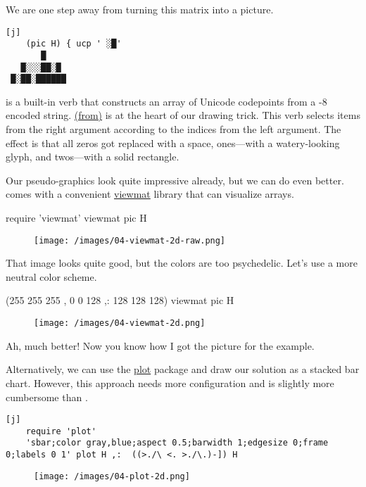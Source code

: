\documentclass{article}
\begin{document}
We are one step away from turning this matrix into a picture.

\begin{verbatim}[j]
    (pic H) { ucp ' ░█'
       █    
   █░░░██░█ 
 █░██░██████
\end{verbatim}

 is a built-in verb that constructs an array of Unicode codepoints from a -8 encoded string.
\href{https://code.jsoftware.com/wiki/Vocabulary/curlylf#dyadic}{\code{\{} (from)} is at the heart of our drawing trick.
This verb selects items from the right argument according to the indices from the left argument.
The effect is that all zeros got replaced with a space, ones---with a watery-looking glyph, and twos---with a solid rectangle.

Our pseudo-graphics look quite impressive already, but we can do even better.
 comes with a convenient \href{https://code.jsoftware.com/wiki/Studio/Viewmat}{viewmat} library that can visualize arrays.

\begin{code}[j]
    require 'viewmat'
    viewmat pic H
\end{code}

\begin{figure}
   \texttt{[image: /images/04-viewmat-2d-raw.png]}
\end{figure}

That image looks quite good, but the colors are too psychedelic.
Let's use a more neutral color scheme.

\begin{code}[j]
    (255 255 255 , 0 0 128 ,: 128 128 128) viewmat pic H
\end{code}

\begin{figure}
   \texttt{[image: /images/04-viewmat-2d.png]}
\end{figure}

Ah, much better!
Now you know how I got the picture for the example.

Alternatively, we can use the \href{https://code.jsoftware.com/wiki/Plot}{plot} package and draw our solution as a stacked bar chart.
However, this approach needs more configuration and is slightly more cumbersome than .

\begin{verbatim}[j]
    require 'plot'
    'sbar;color gray,blue;aspect 0.5;barwidth 1;edgesize 0;frame 0;labels 0 1' plot H ,:  ((>./\ <. >./\.)-]) H
\end{verbatim}
\begin{figure}
    \texttt{[image: /images/04-plot-2d.png]}
\end{figure}
\end{document}
